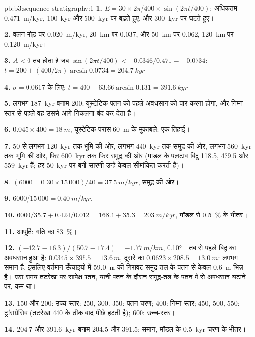 \begin{solution}{pb:b3:sequence-stratigraphy:1}
\textbf{1.} $\dot E = 30\times2\pi/400\times\sin(2\pi t/400)$: अधिकतम
\qty{0.471}{m/kyr}, \qty{100}{kyr} और \qty{500}{kyr} पर बढ़ते हुए, और
\qty{300}{kyr} पर घटते हुए।

\textbf{2.} वलन-मोड़ पर \qty{0.020}{m/kyr}, \qty{20}{km} पर 0.037, और
\qty{50}{km} पर 0.062, \qty{120}{km} पर \qty{0.120}{m/kyr}।

\textbf{3.} $A < 0$ तब होता है जब $\sin(2\pi t/400) < -0.0346/0.471 = -0.0734$:\newline $t =
200 + (400/2\pi)\arcsin0.0734 = \qty{204.7}{kyr}$।

\textbf{4.} $\sigma = 0.0617$ के लिए: $t = 400 - 63.66\arcsin0.131 =
\qty{391.6}{kyr}$।

\textbf{5.} लगभग \qty{187}{kyr} बनाम 200: यूस्टेटिक पतन को पहले अवधसान को
पार करना होगा, और निम्न-स्तर से पहले वह उससे आगे निकलना बंद कर देता है।

\textbf{6.} $0.045\times400 = \qty{18}{m}$, यूस्टेटिक परास \qty{60}{m} के
मुकाबले: एक तिहाई।

\textbf{7.} 50 से लगभग \qty{120}{kyr} तक भूमि की ओर, लगभग
\qty{440}{kyr} तक समुद्र की ओर, लगभग \qty{560}{kyr} तक भूमि की ओर, फिर
\qty{600}{kyr} तक फिर समुद्र की ओर (मॉडल के पलटाव बिंदु 118.5, 439.5 और
\qty{559}{kyr} हैं; हर \qty{50}{kyr} पर बनी सारणी उन्हें केवल सीमांकित करती है)।

\textbf{8.} $(6000 - 0.30\times15\,000)/40 = \qty{37.5}{m/kyr}$, समुद्र की ओर।

\textbf{9.} $6000/15\,000 = \qty{0.40}{m/kyr}$.

\textbf{10.} $6000/35.7 + 0.424/0.012 = 168.1 + 35.3 = \qty{203}{m/kyr}$,
मॉडल से \qty{0.5}{\percent} के भीतर।

\textbf{11.} आपूर्ति: गति का \qty{83}{\percent}।

\textbf{12.} $(-42.7 - 16.3)/(50.7 - 17.4) = \qty{-1.77}{m/km}$, \ang{0.10}।
तब से पहले बिंदु का अवधसान हुआ है: $0.0345\times395.5 =
\qty{13.6}{m}$, दूसरे का $0.0623\times208.5 = \qty{13.0}{m}$: लगभग
समान है, इसलिए वर्तमान ऊँचाइयों में \qty{59.0}{m} की गिरावट
समुद्र-तल के पतन से केवल \qty{0.6}{m} भिन्न है। उस समय तटरेखा पर सापेक्ष
पतन, यानी पतन के दौरान समुद्र-तल के पतन में से अवधसान घटाने पर, कम था।

\textbf{13.} 150 और 200: उच्च-स्तर; 250, 300, 350: पतन-चरण; 400:
निम्न-स्तर; 450, 500, 550: ट्रांसग्रेसिव (तटरेखा 440 के ठीक बाद
पीछे हटती है); 600: उच्च-स्तर।

\textbf{14.} 204.7 और \qty{391.6}{kyr} बनाम 204.5 और 391.5: समान,
मॉडल के \qty{0.5}{kyr} चरण के भीतर।


\end{solution}
